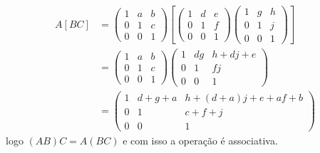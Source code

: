 \documentclass[12pt]{exam}
\begin{document}
\begin{align*}
        A[BC] &= \begin{pmatrix} 1 & a & b\\0 & 1 & c\\0 & 0 & 1\end{pmatrix}\left[\begin{pmatrix} 1 & d & e\\0 & 1 & f\\0 & 0 & 1\end{pmatrix}\begin{pmatrix} 1 & g & h\\0 & 1 & j\\0 & 0 & 1\end{pmatrix}\right] \\ &=\begin{pmatrix} 1 & a & b\\0 & 1 & c\\0 & 0 & 1\end{pmatrix}\begin{pmatrix} 1 & dg & h + dj + e\\0 & 1 & fj\\0 & 0 & 1\end{pmatrix} \\ &= \begin{pmatrix} 1 & d + g + a & h + (d + a)j + e + af + b\\0 & 1 & c + f + j\\0 & 0 & 1\end{pmatrix}
    \end{align*}
    logo $(AB)C = A(BC)$ e com isso a operação é associativa.
\end{document}
